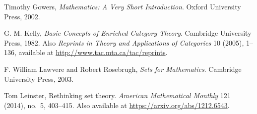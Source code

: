 \begin{citedsource}
Timothy Gowers,
\emph{Mathematics: A Very Short Introduction}.
Oxford University Press,
2002.
\end{citedsource}

\begin{citedsource}
G. M. Kelly,
\emph{Basic Concepts of Enriched Category Theory}.
Cambridge University Press,
1982. 
Also 
\emph{Reprints in Theory and Applications of Categories}
10 (2005), 1--136,
available at 
\href{http://www.tac.mta.ca/tac/reprints}{\url{http://www.tac.mta.ca/tac/reprints}}.
\end{citedsource}

\begin{citedsource}
F. William Lawvere and Robert Rosebrugh,
\emph{Sets for Mathematics}.
Cambridge University Press,
2003.
\end{citedsource}

\begin{citedsource}
Tom Leinster,
Rethinking set theory.
\emph{American Mathematical Mon\-thly} 121 (2014), no.~5, 403--415.
Also available at 
\href{https://arxiv.org/abs/1212.6543}{\url{https://arxiv.org/abs/1212.6543}}.
\end{citedsource}

